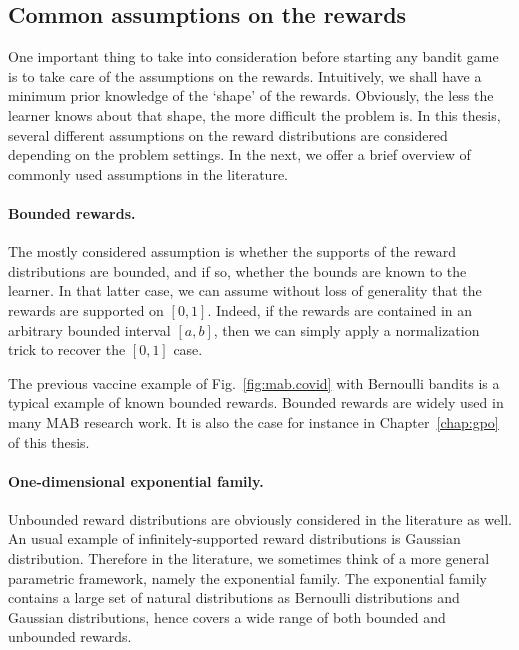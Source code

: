 \subsection{Common assumptions on the rewards}\label{sec:mab.model.assumptions}

One important thing to take into consideration before starting any bandit game is to take care of the assumptions on the rewards. Intuitively, we shall have a minimum prior knowledge of the `shape' of the rewards. Obviously, the less the learner knows about that shape, the more difficult the problem is. In this thesis, several different assumptions on the reward distributions are considered depending on the problem settings. In the next, we offer a brief overview of commonly used assumptions in the literature.

\paragraph{Bounded rewards.}

The mostly considered assumption is whether the supports of the reward distributions are bounded, and if so, whether the bounds are known to the learner. In that latter case, we can assume without loss of generality that the rewards are supported on $[0,1]$. Indeed, if the rewards are contained in an arbitrary bounded interval $[a,b]$, then we can simply apply a normalization trick to recover the $[0,1]$ case.

The previous vaccine example of Fig.~\ref{fig:mab.covid} with Bernoulli bandits is a typical example of known bounded rewards. Bounded rewards are widely used in many MAB research work. It is also the case for instance in Chapter~\ref{chap:gpo} of this thesis.

\paragraph{One-dimensional exponential family.}

Unbounded reward distributions are obviously considered in the literature as well. An usual example of infinitely-supported reward distributions is Gaussian distribution. Therefore in the literature, we sometimes think of a more general parametric framework, namely the exponential family. The exponential family contains a large set of natural distributions as Bernoulli distributions and Gaussian distributions, hence covers a wide range of both bounded and unbounded rewards.

